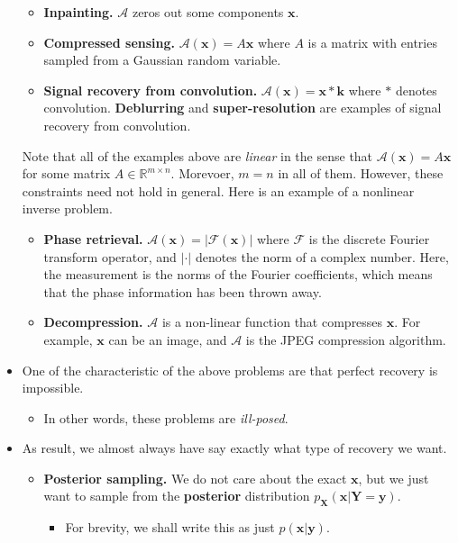 \documentclass[10pt]{article}
\newcommand{\ve}[1]{\mathbf{#1}}
\newcommand{\mcal}[1]{\mathcal{#1}}
\newcommand{\Real}{\mathbb{R}}
\begin{document}
\begin{itemize}
\begin{itemize}
    \item {\bf Inpainting.} $\mcal{A}$ zeros out some components $\ve{x}$.
    
    \item {\bf Compressed sensing.} $\mcal{A}(\ve{x}) = A\ve{x}$ where $A$ is a matrix with entries sampled from a Gaussian random variable.
    
    \item {\bf Signal recovery from convolution.} $\mcal{A}(\ve{x}) = \ve{x} * \ve{k}$ where $*$ denotes convolution. \textbf{Deblurring} and \textbf{super-resolution} are examples of signal recovery from convolution.    
  \end{itemize}  

  Note that all of the examples above are \emph{linear} in the sense that $\mcal{A}(\ve{x}) = A\ve{x}$ for some matrix $A \in \Real^{m \times n}$. Morevoer, $m = n$ in all of them. However, these constraints need not hold in general. Here is an example of a nonlinear inverse problem.

  \begin{itemize}
    \item {\bf Phase retrieval.} $\mcal{A}(\ve{x}) = |\mathscr{F}(\ve{x})|$ where $\mathscr{F}$ is the discrete Fourier transform operator, and $| \cdot |$ denotes the norm of a complex number. Here, the measurement is the norms of the Fourier coefficients, which means that the phase information has been thrown away.
    
    \item {\bf Decompression.} $\mcal{A}$ is a non-linear function that compresses $\ve{x}$. For example, $\ve{x}$ can be an image, and $\mcal{A}$ is the JPEG compression algorithm.
  \end{itemize}

  \item One of the characteristic of the above problems are that perfect recovery is impossible.
  \begin{itemize}
    \item In other words, these problems are \emph{ill-posed}.
  \end{itemize}

  \item As result, we almost always have say exactly what type of recovery we want.
  \begin{itemize}
    \item {\bf Posterior sampling.} We do not care about the exact $\ve{x}$, but we just want to sample from the \textbf{posterior} distribution $p_{\ve{X}}(\ve{x}|\ve{Y} = \ve{y})$.
    \begin{itemize}
      \item For brevity, we shall write this as just $p(\ve{x}|\ve{y})$.
    \end{itemize}


\end{itemize}
\end{itemize}
\end{document}
